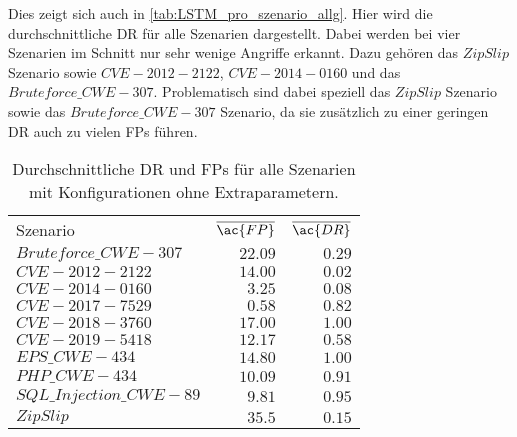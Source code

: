     Dies zeigt sich auch in \autoref{tab:LSTM_pro_szenario_allg}. 
    Hier wird die durchschnittliche \ac{DR} für alle Szenarien dargestellt.
    Dabei werden bei vier Szenarien im Schnitt nur sehr wenige Angriffe erkannt.
    Dazu gehören das $ZipSlip$ Szenario sowie $CVE-2012-2122$, $CVE-2014-0160$ und das $Bruteforce\_CWE-307$.
    Problematisch sind dabei speziell das $ZipSlip$ Szenario sowie das $Bruteforce\_CWE-307$ Szenario, da sie zusätzlich zu einer geringen \ac{DR} auch zu vielen \acp{FP} führen.
    \begin{table}[H]
        \centering
        \begin{tabular}{lrr}
            \hline
            \rowcolor{GruvGray!36}
            \multicolumn{3}{c}{Ohne Extraparameter - pro Szenario}\\
            \toprule
            Szenario & $\overline{\ac{FP}}$ & $\overline{\ac{DR}}$ \\
            \midrule
            \rowcolor{GruvGray!16}
            $Bruteforce\_CWE-307$  &$22.09$ & 	$0.29$ \\
            $CVE-2012-2122$        &$14.00$ & 	$0.02$ \\
            \rowcolor{GruvGray!16}
            $CVE-2014-0160$        &$3.25$ & 	$0.08$ \\
            $CVE-2017-7529$       &$0.58$  & 	$0.82$ \\
            \rowcolor{GruvGray!16}
            $CVE-2018-3760$        &$17.00$ & 	$1.00$ \\
            $CVE-2019-5418$       &$12.17$  & 	$0.58$ \\
            \rowcolor{GruvGray!16}
            $EPS\_CWE-434$         &$14.80$ & 	$1.00$ \\
            $PHP\_CWE-434$         &$10.09$ & 	$0.91$ \\
            \rowcolor{GruvGray!16}
            $SQL\_Injection\_CWE-89$&$9.81$ & 	$0.95$ \\
            $ZipSlip$              &$35.5$ & $0.15$ \\
            \hline
        \end{tabular}
        \caption[Durschnittliche Ergebnisse auf Szenarien aufgeschlüsselt]{Durchschnittliche \ac{DR} und \acp{FP} für alle Szenarien mit Konfigurationen ohne Extraparametern.}
        \label{tab:LSTM_pro_szenario_allg}
    \end{table}


